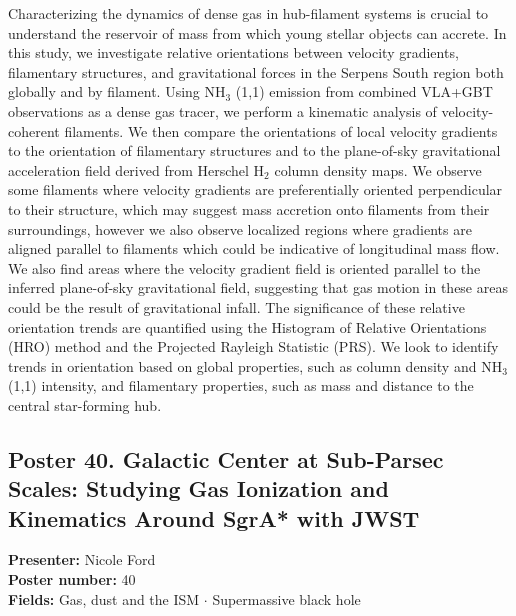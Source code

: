 Characterizing the dynamics of dense gas in hub-filament systems is crucial to understand the reservoir of mass from which young stellar objects can accrete. In this study, we investigate relative orientations between velocity gradients, filamentary structures, and gravitational forces in the Serpens South region both globally and by filament. Using NH$_3$ (1,1) emission from combined VLA+GBT observations as a dense gas tracer, we perform a kinematic analysis of velocity-coherent filaments. We then compare the orientations of local velocity gradients to the orientation of filamentary structures and to the plane-of-sky gravitational acceleration field derived from Herschel H$_2$ column density maps. We observe some filaments where velocity gradients are preferentially oriented perpendicular to their structure, which may suggest mass accretion onto filaments from their surroundings, however we also observe localized regions where gradients are aligned parallel to filaments which could be indicative of longitudinal mass flow. We also find areas where the velocity gradient field is oriented parallel to the inferred plane-of-sky gravitational field, suggesting that gas motion in these areas could be the result of gravitational infall. The significance of these relative orientation trends are quantified using the Histogram of Relative Orientations (HRO) method and the Projected Rayleigh Statistic (PRS). We look to identify trends in orientation based on global properties, such as column density and NH$_3$ (1,1) intensity, and filamentary properties, such as mass and distance to the central star-forming hub.

\hypertarget{poster-abstract-talk-239}{}\label{poster-abstract-page-talk-239}
\subsection*{Poster 40. Galactic Center at Sub-Parsec Scales: Studying Gas Ionization and Kinematics Around SgrA* with JWST}
\textbf{Presenter:} Nicole Ford\\
\textbf{Poster number:} 40\\
\textbf{Fields:} Gas, dust and the ISM $\cdot$ Supermassive black hole

